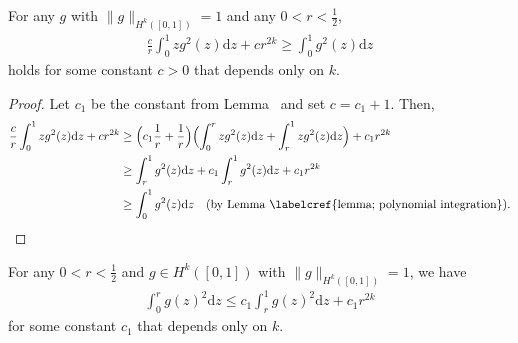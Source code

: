 \documentclass[12pt,a4paper,pdftex,onepage]{article}
\newcommand{\de}{\mathrm{d}}
\begin{document}
\begin{claim}\label{claim; ex 3}
For any \(g\) with \(\|g\|_{H^k([0,1])} =1\) and any \(0<r < \frac{1}{2}\),
\begin{align*}
\frac{c}{r} \int_0^1 zg^2(z) \de z  
+  cr^{2k}
\geq \int_0^1 g^2(z)\de z
\end{align*}
holds for some constant \(c>0\) that depends only on \(k\).
\end{claim}

\begin{proof}
Let \(c_1\) be the constant from Lemma~ and set \(c = c_1 +1\). 
Then,
\begin{align*}
\frac{c}{r} \int_0^1 zg^2(z) \de z  +  cr^{2k} 
&\geq \Bigl(c_1  \frac{1}{r}+\frac{1}{r}\Bigr) 
\Bigl(\int_0^r zg^2(z)\de z + \int_r^1   zg^2(z)\de z \Bigr) 
+  c_1r^{2k}
\\
&\geq \int_r^1 g^2(z)\de z  +c_1 \int_r^1 g^2(z)\de z 
+  c_1r^{2k}  
\\
&\geq \int_0^1  g^2(z)\de z 
\quad \text{(by Lemma~\labelcref{lemma; polynomial integration})}.
\end{align*}
\end{proof}


\begin{lemma}\label{lemma; polynomial integration}
For any \(0<r<\frac{1}{2}\) and \(g \in H^k([0,1])\) with \(\|g\|_{H^k([0,1])}=1\), we have 
\begin{align*}
\int_{0}^r g(z)^2 \de z \leq  c_1 \int_r^1 g(z)^2 \de z +  c_1r^{2k}
\end{align*}
for some constant \(c_1\) that depends only on \(k\).
\end{lemma}
\end{document}
